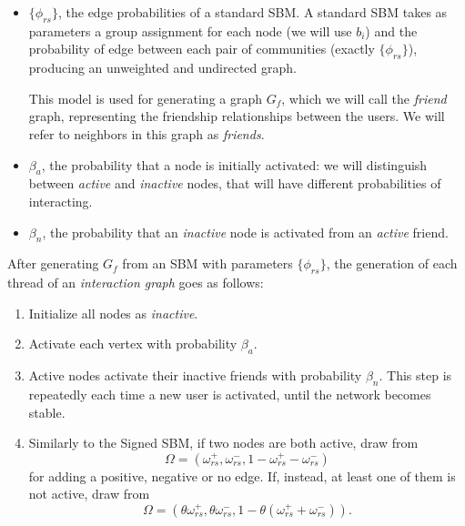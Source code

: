 \begin{itemize}
	\item $\{\phi_{rs} \}$, the edge probabilities of a standard SBM. A standard SBM
	      takes as parameters a group assignment for each node (we will use
	      $b_i$) and the
	      probability of edge between each pair of communities (exactly $\{\phi_{rs} \}$), producing an
	      unweighted and undirected graph.

	      This model is used for generating a graph $G_f$, which we will call the \emph{friend} graph,
	      representing the friendship relationships between the users. We will
	      refer to neighbors in this graph as \emph{friends}.
	\item $\beta _a$, the probability that a node is initially activated: we
	      will distinguish between \emph{active} and \emph{inactive} nodes, that will have
	      different probabilities of interacting.
	\item $\beta _n$, the probability that an \emph{inactive} node is activated
	      from an \emph{active} friend.
\end{itemize}

\bigskip
After generating $G_f$ from an SBM with parameters $\{\phi_{rs} \}$, the
generation of each thread of an \emph{interaction graph} goes as
follows:

\begin{enumerate}
	\item Initialize all nodes as \emph{inactive}.
	\item Activate each vertex with probability $\beta_{a}  $.
	\item Active nodes activate their inactive friends with
	      probability $\beta_n$. This step is repeatedly each time a new user
	      is activated, until the network becomes stable.
	\item Similarly to the Signed SBM, if two nodes are both active, draw
	      from
	      \begin{equation*}
		      \Omega = (\omega _{rs} ^{+}, \omega _{rs} ^{-}, 1 - \omega _{rs} ^{+} -
		      \omega _{rs} ^{-})
	      \end{equation*}
	      for adding a positive, negative or no edge. If, instead, at least one
	      of them is not active, draw from
	      \begin{equation*}
		      \Omega = (\theta \omega _{rs} ^{+}, \theta \omega _{rs} ^{-}, 1
		      - \theta (\omega _{rs} ^{+} + \omega _{rs} ^{-})).
	      \end{equation*}
\end{enumerate}

